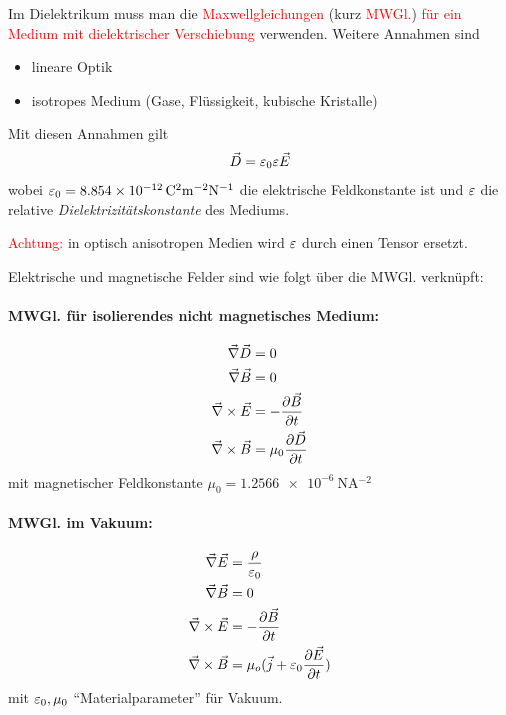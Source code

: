 Im Dielektrikum muss man die \textcolor{red}{Maxwellgleichungen} (kurz
\textcolor{red}{MWGl.}) \textcolor{red}{für ein Medium mit
  dielektrischer Verschiebung}%
verwenden. 
Weitere Annahmen sind
\begin{itemize}
\item lineare Optik
\item isotropes Medium (Gase, Flüssigkeit, kubische Kristalle)
\end{itemize}
Mit diesen Annahmen gilt
\begin{gather*}
  \vec{D}=\eps_0\eps\vec{E}
\end{gather*}%
%
%
%
%
wobei $\eps_0=\SI{8.854e-12}{\coulomb^2\m^{-2}\newton^{-1}}$
die elektrische Feldkonstante ist und
\emph{$\eps$} die relative \emph{Dielektrizitätskonstante}%
 des Mediums.

\textcolor{red}{Achtung:} in optisch anisotropen Medien wird
$\eps$ durch einen Tensor ersetzt.

Elektrische und magnetische Felder sind wie folgt über die MWGl. verknüpft:
\paragraph{MWGl. für isolierendes nicht magnetisches Medium:}
\begin{align*}	 
  \vecna\vec{D}&=0\\
  \vecna\vec{B}&=0\\
  \vecna\times\vec{E}&=-\dif[\vec{B}]{t}\\
  \vecna\times\vecB&=\mu_0 \dif[\vec{D}]{t}
\end{align*}%
%
mit magnetischer Feldkonstante 
$\mu_0=\SI{1.2566e-6}{\newton\ampere^{-2}}$%

\paragraph{MWGl. im Vakuum:}
\begin{align*}
  \vecna \vecE &=\frac{\rho}{\eps_0}\\
  \vecna\vecB&=0\\
  \vecna\times\vecE&=-\dif[\vecB]{t}\\
  \vecna\times\vecB&=\mu_o(\vec{j}+\eps_0\frac{\partial\vecE}{\partial t})
\end{align*}
mit $\eps_0,\mu_0$ \enquote{Materialparameter} für Vakuum.


